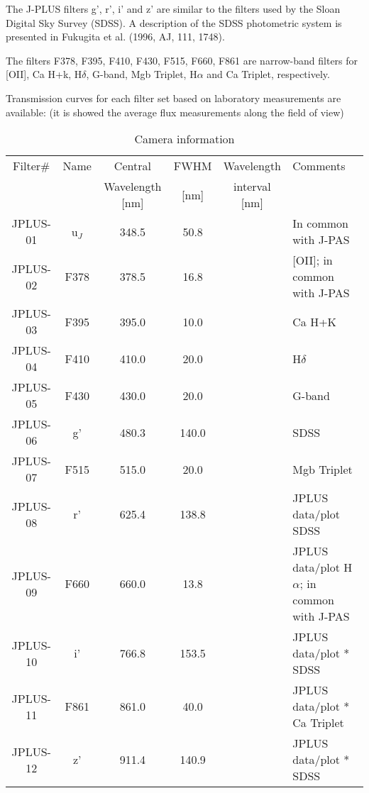 \documentclass[12pt,preprint]{aastex}
\begin{document}
The J-PLUS filters g', r', i' and z' are similar to the filters used by the Sloan Digital Sky Survey (SDSS).  A description of the SDSS photometric system is presented in Fukugita et al. (1996, AJ, 111, 1748).

The filters F378, F395, F410, F430, F515, F660, F861 are narrow-band filters for [OII], Ca H+k, H$\delta$, G-band, Mgb Triplet, H$\alpha$ and Ca Triplet, respectively.

Transmission curves for each filter set based on laboratory measurements are available: 
(it is showed the average flux measurements along the field of view)


\begin{table*}
 \centering
   \label{table:result}
    \begin{minipage}{140mm}
\scriptsize
\caption{Camera information}   
                       
\begin{tabular}{c c c c c l}     %
\hline\hline   


Filter$\#$ & Name &  Central                   & FWHM     & Wavelength   &  Comments \\
           &            & Wavelength [nm]    & [nm]          & interval [nm]  &  \\
\hline

JPLUS-01 &	u$_J$ &	348.5 & 50.8	 &  & 	In common with J-PAS \\
JPLUS-02 &	F378 &	 378.5 &	16.8 &	& 	[OII]; in common with J-PAS \\
JPLUS-03 &	F395 &	395.0 &	10.0 &   &	Ca H+K \\
JPLUS-04 &	F410 &	410.0 &	20.0 &	& 	H$\delta$ \\
JPLUS-05 &	F430 &	430.0 &	20.0 &	&	G-band \\
JPLUS-06 &	 g'    & 	480.3 &	140.0 &	& 	SDSS \\
JPLUS-07 &	F515 &	515.0 &	20.0 &	& 	Mgb Triplet \\
JPLUS-08 &	r'	  & 625.4  &	138.8 &	 &	JPLUS data/plot	SDSS \\
JPLUS-09 &	F660 &	660.0 &	13.8	 & & 	JPLUS data/plot	H$\alpha$; in common with J-PAS \\
JPLUS-10 &	i' &	 766.8 &	153.5 &	 & 	JPLUS data/plot *	SDSS \\
JPLUS-11 &	F861 &	861.0 &	40.0 &	& 	JPLUS data/plot *	Ca Triplet \\
JPLUS-12 &	z'  &	 911.4 &	140.9	&  & 	JPLUS data/plot *	SDSS \\

\hline                  
\end{tabular}
\end{minipage}
\end{table*}   
\end{document}
